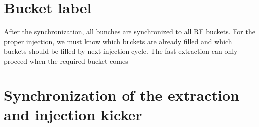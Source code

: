 %
%
%
%
%



\section{Bucket label}
After the synchronization, all bunches are synchronized to all RF buckets. For the proper injection, we must know which buckets are already filled and which buckets should be filled by next injection cycle. The fast extraction can only proceed when the required bucket comes. 

\section{Synchronization of the extraction and injection kicker}
\label{sec:kicker}

